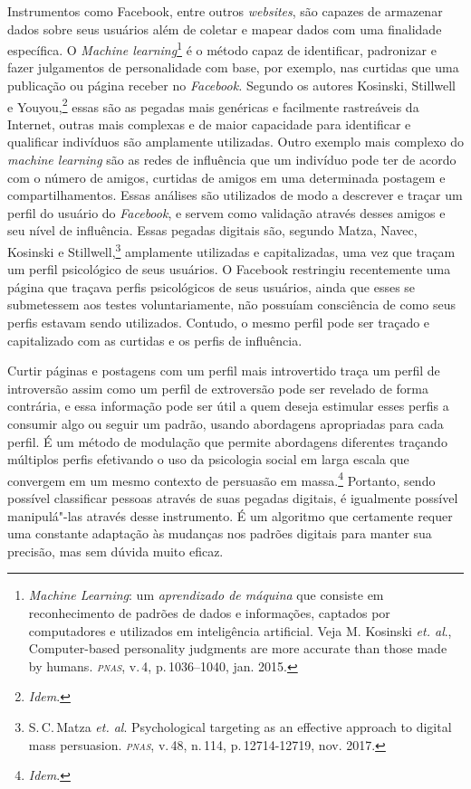 Instrumentos como Facebook, entre outros \textit{websites}, são capazes de
armazenar dados sobre seus usuários além de coletar e mapear dados com
uma finalidade específica. O \textit{Machine learning}\footnote{\textit{Machine
  Learning}: um \textit{aprendizado de máquina} que consiste em reconhecimento
  de padrões de dados e informações, captados por computadores e
  utilizados em inteligência artificial. Veja M. Kosinski \textit{et. al}., Computer-based
personality judgments are more accurate than those made by
humans. \textit{\textsc{pnas}}, v.\,4, p.\,1036--1040, jan. 2015.} é o método capaz de identificar, padronizar e fazer julgamentos
de personalidade com base, por exemplo, nas curtidas que uma publicação
ou página receber no \textit{Facebook.} Segundo os autores
Kosinski, Stillwell e Youyou,\footnote{\textit{Idem}.} essas são as pegadas mais genéricas
e facilmente rastreáveis da Internet, outras mais complexas e de maior
capacidade para identificar e qualificar indivíduos são amplamente
utilizadas. Outro exemplo mais complexo do \textit{machine learning} são
as redes de influência que um indivíduo pode ter de acordo com o número
de amigos, curtidas de amigos em uma determinada postagem e
compartilhamentos. Essas análises são utilizados de modo a descrever
e traçar um perfil do usuário do \textit{Facebook}, e servem como
validação através desses amigos e seu nível de influência. Essas pegadas
digitais são, segundo Matza, Navec, Kosinski e Stillwell,\footnote{S.\,C.\,Matza \textit{et. al}. Psychological targeting as an effective approach to digital mass persuasion. \textit{\textsc{pnas}}, v.\,48, n.\,114, p.\,12714-12719, nov. 2017.}
amplamente utilizadas e capitalizadas, uma vez que traçam um perfil
psicológico de seus usuários. O Facebook restringiu recentemente uma
página que traçava perfis psicológicos de seus usuários, ainda que esses
se submetessem aos testes voluntariamente, não possuíam consciência de
como seus perfis estavam sendo utilizados. Contudo, o mesmo perfil pode
ser traçado e capitalizado com as curtidas e os perfis de influência.

Curtir páginas e postagens com um perfil mais introvertido traça um
perfil de introversão assim como um perfil de extroversão pode ser
revelado de forma contrária, e essa informação pode ser útil a quem
deseja estimular esses perfis a consumir algo ou seguir um padrão,
usando abordagens apropriadas para cada perfil. É um método de modulação
que permite abordagens diferentes traçando múltiplos perfis efetivando o
uso da psicologia social em larga escala que convergem em um mesmo
contexto de persuasão em massa.\footnote{\textit{Idem}.}
Portanto, sendo possível classificar pessoas através de suas pegadas
digitais, é igualmente possível manipulá"-las através desse instrumento.
É um algoritmo que certamente requer uma constante adaptação às mudanças
nos padrões digitais para manter sua precisão, mas sem dúvida muito
eficaz.

